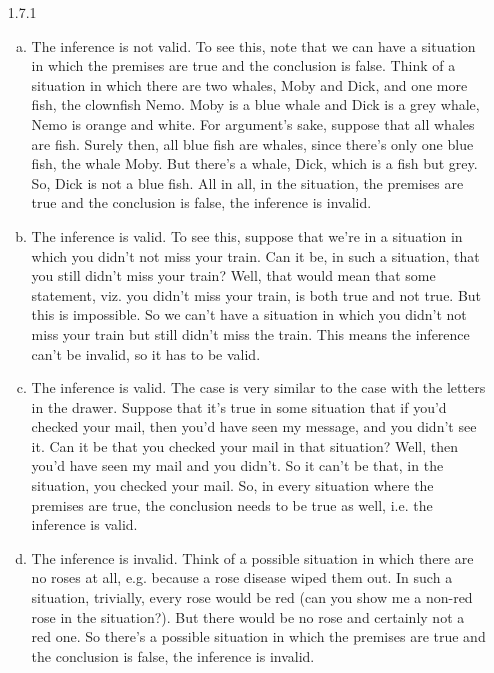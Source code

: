 	\begin{enumerate}
	
		\item[1.7.1] \begin{enumerate}[(a)]
		
			\item The inference is not valid. To see this, note that we can have a situation in which the premises are true and the conclusion is false. Think of a situation in which there are two whales, Moby and Dick, and one more fish, the clownfish Nemo. Moby is a blue whale and Dick is a grey whale, Nemo is orange and white. For argument's sake, suppose that all whales are fish. Surely then, all blue fish are whales, since there's only one blue fish, the whale Moby. But there's a whale, Dick, which is a fish but grey. So, Dick is not a blue fish. All in all, in the situation, the premises are true and the conclusion is false, the inference is invalid.
			
			\item The inference is valid. To see this, suppose that we're in a situation in which you didn't not miss your train. Can it be, in such a situation, that you still didn't miss your train? Well, that would mean that some statement, viz. you didn't miss your train, is both true and not true. But this is impossible. So we can't have a situation in which you didn't not miss your train but still didn't miss the train. This means the inference can't be invalid, so it has to be valid.
			
			\item The inference is valid. The case is very similar to the case with the letters in the drawer. Suppose that it's true in some situation that if you'd checked your mail, then you'd have seen my message, and you didn't see it. Can it be that you checked your mail in that situation? Well, then you'd have seen my mail and you didn't. So it can't be that, in the situation, you checked your mail. So, in every situation where the premises are true, the conclusion needs to be true as well, i.e. the inference is valid. 
			
			\item The inference is invalid. Think of a possible situation in which there are no roses at all, e.g. because a rose disease wiped them out. In such a situation, trivially, every rose would be red (can you show me a non-red rose in the situation?). But there would be no rose and certainly not a red one. So there's a possible situation in which the premises are true and the conclusion is false, the inference is invalid.
			

\end{enumerate}
\end{enumerate}
